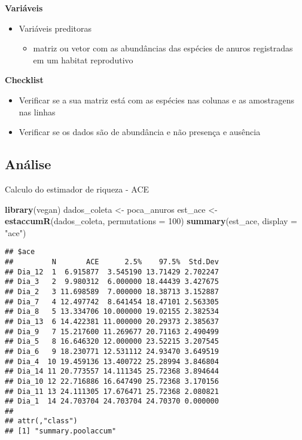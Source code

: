 \documentclass[
]{book}
\newenvironment{Shaded}{\begin{snugshade}}{\end{snugshade}}
\newcommand{\DataTypeTok}[1]{\textcolor[rgb]{0.13,0.29,0.53}{#1}}
\newcommand{\DecValTok}[1]{\textcolor[rgb]{0.00,0.00,0.81}{#1}}
\newcommand{\KeywordTok}[1]{\textcolor[rgb]{0.13,0.29,0.53}{\textbf{#1}}}
\newcommand{\NormalTok}[1]{#1}
\newcommand{\StringTok}[1]{\textcolor[rgb]{0.31,0.60,0.02}{#1}}
\providecommand{\tightlist}{%
  \setlength{\itemsep}{0pt}\setlength{\parskip}{0pt}}
\begin{document}
\textbf{Variáveis}

\begin{itemize}
\tightlist
\item
  Variáveis preditoras

  \begin{itemize}
  \tightlist
  \item
    matriz ou vetor com as abundâncias das espécies de anuros registradas em um habitat reprodutivo
  \end{itemize}
\end{itemize}

\textbf{Checklist}

\begin{itemize}
\tightlist
\item
  Verificar se a sua matriz está com as espécies nas colunas e as amostragens nas linhas
\item
  Verificar se os dados são de abundância e não presença e ausência
\end{itemize}

\hypertarget{anuxe1lise-1}{%
\subsection{Análise}\label{anuxe1lise-1}}

Calculo do estimador de riqueza - ACE

\begin{Shaded}
\begin{Highlighting}[]
\KeywordTok{library}\NormalTok{(vegan)}
\NormalTok{dados_coleta <-}\StringTok{ }\NormalTok{poca_anuros}
\NormalTok{est_ace <-}\StringTok{ }\KeywordTok{estaccumR}\NormalTok{(dados_coleta, }\DataTypeTok{permutations =} \DecValTok{100}\NormalTok{)}
\KeywordTok{summary}\NormalTok{(est_ace, }\DataTypeTok{display =} \StringTok{"ace"}\NormalTok{)}
\end{Highlighting}
\end{Shaded}

\begin{verbatim}
## $ace
##         N       ACE      2.5%    97.5%  Std.Dev
## Dia_12  1  6.915877  3.545190 13.71429 2.702247
## Dia_3   2  9.980312  6.000000 18.44439 3.427675
## Dia_2   3 11.698589  7.000000 18.38713 3.152887
## Dia_7   4 12.497742  8.641454 18.47101 2.563305
## Dia_8   5 13.334706 10.000000 19.02155 2.382534
## Dia_13  6 14.422381 11.000000 20.29373 2.385637
## Dia_9   7 15.217600 11.269677 20.71163 2.490499
## Dia_5   8 16.646320 12.000000 23.52215 3.207545
## Dia_6   9 18.230771 12.531112 24.93470 3.649519
## Dia_4  10 19.459136 13.400722 25.28994 3.846804
## Dia_14 11 20.773557 14.111345 25.72368 3.894644
## Dia_10 12 22.716886 16.647490 25.72368 3.170156
## Dia_11 13 24.111305 17.676471 25.72368 2.080821
## Dia_1  14 24.703704 24.703704 24.70370 0.000000
## 
## attr(,"class")
## [1] "summary.poolaccum"
\end{verbatim}
\end{document}
